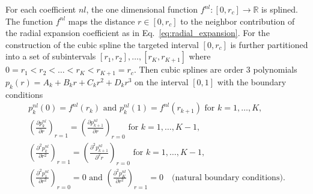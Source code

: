 For each coefficient $nl$, the one dimensional function $f^{nl}:[0,r_c]\rightarrow\mathbb{R}$ is splined.
The function $f^{nl}$ maps the distance $r\in[0,r_c]$ to the neighbor contribution of the radial expansion coefficient as in Eq.~\eqref{eq:radial_expansion}.
For the construction of the cubic spline the targeted interval $[0,r_c]$ is further partitioned into a set of subintervals $[r_1, r_2], \ldots, [r_{K}, r_{K+1}]$ where $0 = r_1 < r_2 < \ldots < r_{K} < r_{K+1} = r_c$.
Then cubic splines are order 3 polynomials $p_k(r) = A_k + B_kr + C_kr^2 + D_kr^3$ on the interval $[0,1]$ with the boundary conditions
\begin{subequations}
\label{eq:abscissas_boundary_conditions}
\begin{gather}
    p^{nl}_{k}(0) = f^{nl}(r_k)\text{ and } p^{nl}_{k}(1) =  f^{nl}(r_{k+1})\text{ for } k=1,\ldots,K , \label{eq:function_boundary_conditions}\\
    \left(\frac{\partial p^{nl}_{k}}{\partial r}\right)_{r=1} = \left(\frac{\partial p^{nl}_{k+1}}{\partial r}\right)_{r=0} \text{ for } k=1,\ldots,K-1  ,\label{eq:derivative_boundary_conditions}\\
    \left(\frac{\partial^2 p^{nl}_{k}}{\partial r^2}\right)_{r=1} = \left(\frac{\partial^2 p^{nl}_{k+1}}{\partial^2 r}\right)_{r=0} \text{ for } k=1,\ldots,K-1  ,\label{eq:second_derivative_boundary_conditions}\\
    \left(\frac{\partial^2 p^{nl}_{1}}{\partial r^2}\right)_{r=0} = 0\text{ and } \left(\frac{\partial^2 p^{nl}_{K}}{\partial r^2}\right)_{r=1}=0\quad\text{(natural boundary conditions)}.\label{eq:natural_boundary_conditions}
\end{gather}
\end{subequations}
